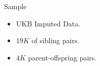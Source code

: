 \documentclass{beamer}
\begin{document}


\begin{frame}{Sample}
      \begin{itemize}
            \item UKB Imputed Data.
            \item \(19K\) of sibling pairs.
            \item \(4K\) parent-offspring pairs.
      \end{itemize}
\end{frame}
\end{document}
